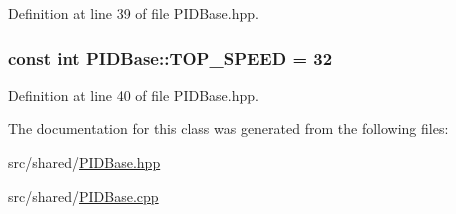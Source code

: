 Definition at line 39 of file P\-I\-D\-Base.\-hpp.

\hypertarget{classPIDBase_a42e66aae0ea7d5a54bffc062cc3ebf2b}{
\subsubsection[{T\-O\-P\-\_\-\-S\-P\-E\-E\-D}]{\setlength{\rightskip}{0pt plus 5cm}const int P\-I\-D\-Base\-::\-T\-O\-P\-\_\-\-S\-P\-E\-E\-D = 32\hspace{0.3cm}{\ttfamily [private]}}}\label{classPIDBase_a42e66aae0ea7d5a54bffc062cc3ebf2b}


Definition at line 40 of file P\-I\-D\-Base.\-hpp.



The documentation for this class was generated from the following files\-:\begin{DoxyCompactItemize}
\item 
src/shared/\hyperlink{PIDBase_8hpp}{P\-I\-D\-Base.\-hpp}\item 
src/shared/\hyperlink{PIDBase_8cpp}{P\-I\-D\-Base.\-cpp}\end{DoxyCompactItemize}
